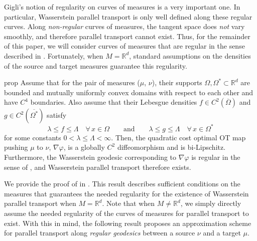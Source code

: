 \documentclass[11pt]{article}
\newcommand{\man}{M}
\begin{document}
Gigli's notion of regularity on curves of measures is a very important one. In particular, Wasserstein parallel transport is only well defined along these regular curves. Along \textit{non-regular} curves of measures, the tangent space does \textit{not} vary smoothly, and therefore parallel transport cannot exist. Thus, for the remainder of this paper, we will consider curves of measures that are regular in the sense described in . Fortunately, when $\man = \mathbb{R}^d$, standard assumptions on the densities of the source and target measures guarantee this regularity. 

\begin{restatable}[Existence of Wasserstein parallel transport, $\man = \mathbb{R}^d$]{prop}{} \label{assumption implications}
    Assume that for the pair of measures ($\mu$, $\nu$), their supports $\Omega, \Omega^* \subset \mathbb{R}^d$ are bounded and mutually uniformly convex domains with respect to each other and have $C^4$ boundaries. Also assume that their Lebesgue densities $f \in C^2(\overline\Omega)$ and $g \in C^2(\overline{\Omega^*})$ satisfy 
    \[\lambda \leq f \leq \Lambda \quad \forall \,x \in \Omega \qquad \text{and} \qquad \lambda \leq g \leq \Lambda \quad \forall \, x \in \Omega^*\]
    for some constants $0 < \lambda \leq \Lambda < \infty$. Then, the quadratic cost optimal OT map pushing $\mu$ to $\nu$, $\nabla \varphi$, is a globally $C^{2}$ diffeomorphism and is bi-Lipschitz. Furthermore, the Wasserstein geodesic corresponding to $\nabla \varphi$ is regular in the sense of , and Wasserstein parallel transport therefore exists.
\end{restatable}

We provide the proof of  in . This result describes sufficient conditions on the measures that guarantees the needed regularity for the existence of Wasserstein parallel transport when $\man = \mathbb{R}^d$. Note that when $\man \neq \mathbb{R}^d$, we simply directly assume the needed regularity of the curves of measures for parallel transport to exist. With this in mind, the following result proposes an approximation scheme for parallel transport along \textit{regular geodesics} between a source $\nu$ and a target $\mu$.
\end{document}
